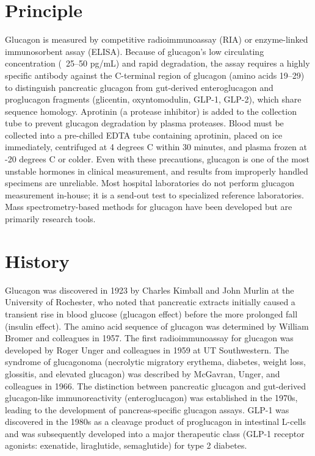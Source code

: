 \section*{Principle}
Glucagon is measured by competitive radioimmunoassay (RIA) or enzyme-linked immunosorbent assay (ELISA). Because of glucagon's low circulating concentration (~25--50 pg/mL) and rapid degradation, the assay requires a highly specific antibody against the C-terminal region of glucagon (amino acids 19--29) to distinguish pancreatic glucagon from gut-derived enteroglucagon and proglucagon fragments (glicentin, oxyntomodulin, GLP-1, GLP-2), which share sequence homology. Aprotinin (a protease inhibitor) is added to the collection tube to prevent glucagon degradation by plasma proteases. Blood must be collected into a pre-chilled EDTA tube containing aprotinin, placed on ice immediately, centrifuged at 4 degrees C within 30 minutes, and plasma frozen at -20 degrees C or colder. Even with these precautions, glucagon is one of the most unstable hormones in clinical measurement, and results from improperly handled specimens are unreliable. Most hospital laboratories do not perform glucagon measurement in-house; it is a send-out test to specialized reference laboratories. Mass spectrometry-based methods for glucagon have been developed but are primarily research tools.

\section*{History}
Glucagon was discovered in 1923 by Charles Kimball and John Murlin at the University of Rochester, who noted that pancreatic extracts initially caused a transient rise in blood glucose (glucagon effect) before the more prolonged fall (insulin effect). The amino acid sequence of glucagon was determined by William Bromer and colleagues in 1957. The first radioimmunoassay for glucagon was developed by Roger Unger and colleagues in 1959 at UT Southwestern. The syndrome of glucagonoma (necrolytic migratory erythema, diabetes, weight loss, glossitis, and elevated glucagon) was described by McGavran, Unger, and colleagues in 1966. The distinction between pancreatic glucagon and gut-derived glucagon-like immunoreactivity (enteroglucagon) was established in the 1970s, leading to the development of pancreas-specific glucagon assays. GLP-1 was discovered in the 1980s as a cleavage product of proglucagon in intestinal L-cells and was subsequently developed into a major therapeutic class (GLP-1 receptor agonists: exenatide, liraglutide, semaglutide) for type 2 diabetes.

